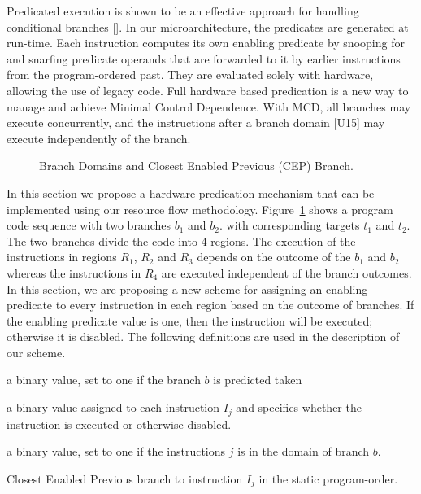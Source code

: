 \documentclass[10pt,twocolumn]{IEEEtran}
\begin{document}
Predicated execution is shown to be an effective approach for handling
conditional branches [].  In our microarchitecture, the predicates are
generated at run-time.  Each instruction computes its own enabling
predicate by snooping for and snarfing predicate operands that are
forwarded to it by earlier instructions from the program-ordered past.
They are evaluated solely with hardware, allowing the use of legacy
code.  Full hardware based predication is a new way to manage and
achieve Minimal Control Dependence.  With MCD, all branches may execute
concurrently, and the instructions after a branch domain [U15] may
execute independently of the branch.

\begin{figure}
{}
\caption{Branch Domains and Closest Enabled Previous (CEP) Branch.}
\label{fig:brdomain}
\end{figure}  
 
In this section we propose a hardware predication mechanism that can be
implemented using our resource flow methodology.
Figure~\ref{fig:brdomain} shows a program code sequence with two
branches $b_1$ and $b_2$.  with corresponding targets $t_1$ and $t_2$.
The two branches divide the code into 4 regions.  The execution of the
instructions in regions $R_1$, $R_2$ and $R_3$ depends on the outcome
of the $b_1$ and $b_2$ whereas the instructions in $R_4$ are executed
independent of the branch outcomes.  In this section, we are proposing
a new scheme for assigning an enabling predicate to every instruction
in each region based on the outcome of branches.  If the enabling
predicate value is one, then the instruction will be executed;
otherwise it is disabled.  The following definitions are used in the
description of our scheme.

\vspace{0.2 in}
\begin{description}
\item[$T_b$:] a binary value, set to one if the branch $b$ is predicted 
taken
\item[$ex_j$:] a binary value assigned to each instruction $I_j$ and 
specifies whether the instruction is executed or otherwise disabled.
\item[$D_b(I_j)$:] a binary value, set to one if the 
instructions $j$ is in the 
domain of branch $b$.
\item[$CEP(I_j)$:] Closest Enabled Previous branch to instruction $I_j$ in 
the static program-order.
\end{description}
\vspace{0.2 in}
\end{document}
